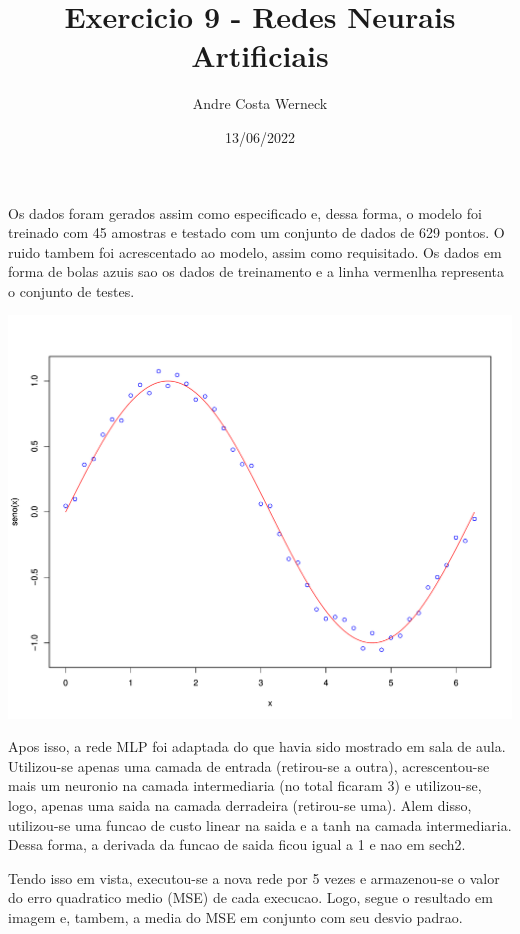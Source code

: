 \documentclass{article}
\begin{document}


\title{Exercicio 9 - Redes Neurais Artificiais}
\author{Andre Costa Werneck}
\date{13/06/2022}
\maketitle
\newpage

Os dados foram gerados assim como especificado e, dessa forma, o modelo foi treinado com 45 amostras e testado com um conjunto de dados de 629 pontos. O ruido tambem foi acrescentado ao modelo, assim como requisitado. Os dados em forma de bolas azuis sao os dados de treinamento e a linha vermenlha representa o conjunto de testes. 

\begin{center}
\includegraphics{ex9_AndreWerneck-002}
\end{center}

Apos isso, a rede MLP foi adaptada do que havia sido mostrado em sala de aula. Utilizou-se apenas uma camada de entrada (retirou-se a outra), acrescentou-se mais um neuronio na camada intermediaria (no total ficaram 3) e utilizou-se, logo, apenas uma saida na camada derradeira (retirou-se uma). Alem disso, utilizou-se uma funcao de custo linear na saida e a tanh na camada intermediaria. Dessa forma, a derivada da funcao de saida ficou igual a 1 e nao em sech2. 

Tendo isso em vista, executou-se a nova rede por 5 vezes e armazenou-se o valor do erro quadratico medio (MSE) de cada execucao. Logo, segue o resultado em imagem e, tambem, a media do MSE em conjunto com seu desvio padrao. 
\end{document}
